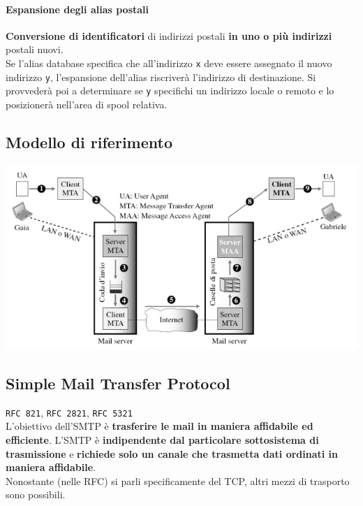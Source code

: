 \documentclass[10pt]{article}
\begin{document}
\paragraph{Espansione degli alias postali} \textbf{Conversione di identificatori} di indirizzi postali \textbf{in uno o più indirizzi} postali nuovi.\\
Se l'alias database specifica che all'indirizzo \texttt{x} deve essere assegnato il nuovo indirizzo \texttt{y}, l'espansione dell'alias riscriverà l'indirizzo di destinazione. Si provvederà poi a determinare se \texttt{y} specifichi un indirizzo locale o remoto e lo posizionerà nell'area di spool relativa.
\pagebreak
\subsection{Modello di riferimento}
\begin{center}
\includegraphics[scale=0.7]{mailmodelloriferimento.png}
\end{center}
\subsection{Simple Mail Transfer Protocol}
\texttt{RFC 821}, \texttt{RFC 2821}, \texttt{RFC 5321}\\
L'obiettivo dell'SMTP è \textbf{trasferire le mail in maniera affidabile ed efficiente}. L'SMTP è \textbf{indipendente dal particolare sottosistema di trasmissione} e \textbf{richiede solo un canale che trasmetta dati ordinati in maniera affidabile}.\\
Nonostante (nelle RFC) si parli specificamente del TCP, altri mezzi di trasporto sono possibili.
\end{document}
